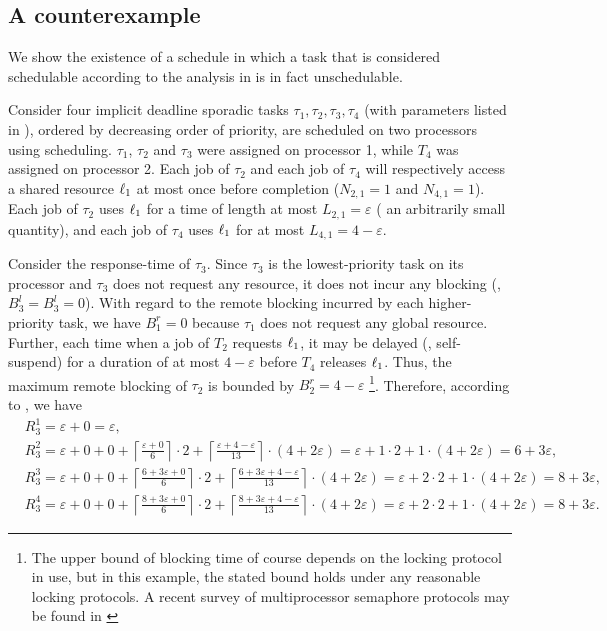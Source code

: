 \subsection{A counterexample}

We show the existence of a schedule in which a task that is considered schedulable according to the analysis in \cite{lakshmanan-2009} is in fact unschedulable.




Consider four implicit deadline sporadic tasks ${\tau_1, \tau_2, \tau_3, \tau_4}$ (with parameters listed in ), ordered by decreasing order of priority, are scheduled on two processors using \pfp scheduling. $\tau_1$, $\tau_2$ and $\tau_3$ were assigned on processor 1, while $T_4$ was assigned on processor 2. Each job of $\tau_2$ and each job of $\tau_4$ will respectively access a shared resource $\ell_1$ at most once before completion ($N_{2,1} = 1$ and $N_{4,1} = 1$). Each job of $\tau_2$ uses $\ell_1$ for a time of length at most $L_{2,1} = \varepsilon$ ( an arbitrarily small quantity), and each job of $\tau_4$ uses $\ell_1$ for at most $L_{4,1} = 4-\varepsilon$. 

Consider the response-time of $\tau_3$. Since $\tau_3$ is the lowest-priority task on its processor and $\tau_3$ does not request any resource, it does not incur any blocking (\ie, $B_3^l = B_3^l = 0$). With regard to the remote blocking incurred by each higher-priority task, we have $B_1^r = 0$ because $\tau_1$ does not request any global resource. Further, each time when a job of $T_2$ requests $\ell_1$, it may be delayed (\ie, self-suspend) for a duration of at most $4-\varepsilon$ before $T_4$ releases $\ell_1$. Thus, the maximum remote blocking of $\tau_2$ is bounded by $B_2^r = 4-\varepsilon$ \footnote{The upper bound of blocking time of course depends on the locking protocol in use, but in this example, the stated bound holds under any reasonable locking protocols. A recent survey of multiprocessor semaphore protocols may be found in \cite{bbb-2013,yang-2015}}. Therefore, according to , we have 
\begin{align*}
& R_3^1 = \varepsilon + 0 = \varepsilon, \\
& R_3^2 = \varepsilon + 0 + 0 + \left \lceil \frac{\varepsilon + 0}{6} \right \rceil \cdot 2 + \left \lceil \frac{\varepsilon + 4 - \varepsilon}{13} \right \rceil \cdot (4+2\varepsilon) = \varepsilon + 1 \cdot 2 + 1 \cdot (4+2\varepsilon) = 6+3\varepsilon, \\
& R_3^3 = \varepsilon + 0 + 0 + \left \lceil \frac{6+3\varepsilon + 0}{6} \right \rceil \cdot 2 + \left \lceil \frac{6+3\varepsilon + 4-\varepsilon}{13} \right \rceil \cdot (4+2\varepsilon) = \varepsilon + 2 \cdot 2 + 1 \cdot (4+2\varepsilon) = 8+3\varepsilon, \\
& R_3^4 = \varepsilon + 0 + 0 + \left \lceil \frac{8+3\varepsilon + 0}{6} \right \rceil \cdot 2 + \left \lceil \frac{8+3\varepsilon + 4-\varepsilon}{13} \right \rceil \cdot (4+2\varepsilon) = \varepsilon + 2 \cdot 2 + 1 \cdot (4+2\varepsilon) = 8+3\varepsilon.
\end{align*}
 
